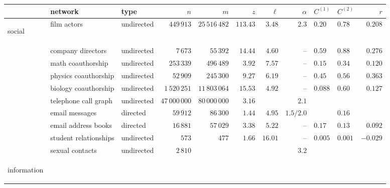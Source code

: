 \begin{table}[!hbt]
\centering
\resizebox{16cm}{!} {
\begin{tabular}{l|l|l|r|r|r|r|r|l|l|r|}
 & network                   & type       & $n$             & $m$                & $z$     & $\ell$  & $\alpha$
 & $C^{(1)}$ & $C^{(2)}$ & $r$ \\
\hline
\begin{rotate}{90}
\hbox{\hspace{-7.1em}social}
\end{rotate}
 & film actors               & undirected & $449\,913$      & $25\,516\,482$     & $113.43$& $3.48$  & $2.3$
 & $0.20$  & $0.78$  & $0.208$  \\
 & company directors         & undirected & $7\,673$        & $55\,392$          & $14.44$ & $4.60$  & --
 & $0.59$  & $0.88$  & $0.276$  \\
 & math coauthorship         & undirected & $253\,339$      & $496\,489$         & $3.92$  & $7.57$  & --
 & $0.15$  & $0.34$  & $0.120$  \\
 & physics coauthorship      & undirected & $52\,909$       & $245\,300$         & $9.27$  & $6.19$  & --
 & $0.45$  & $0.56$  & $0.363$  \\
 & biology coauthorship      & undirected & $1\,520\,251$   & $11\,803\,064$     & $15.53$ & $4.92$  & --
 & $0.088$ & $0.60$  & $0.127$  \\
 & telephone call graph      & undirected & $47\,000\,000$  & $80\,000\,000$     & $3.16$  &         & $2.1$
 &         &      &          \\
 & email messages            & directed   & $59\,912$       & $86\,300$          & $1.44$  & $4.95$  & $1.5/2.0$
 &         & $0.16$  &          \\
 & email address books       & directed   & $16\,881$       & $57\,029$          & $3.38$  & $5.22$  & --
 & $0.17$  & $0.13$  & $0.092$  \\
 & student relationships     & undirected & $573$           & $477$              & $1.66$  & $16.01$ & --
 & $0.005$ & $0.001$ & $-0.029$ \\
 & sexual contacts           & undirected & $2\,810$        &                    &         &         & $3.2$
 &         &         &          \\
\hline
\begin{rotate}{90}
\hbox{\hspace{-4.9em}information}
\end{rotate}

\end{tabular}}
\end{table}

